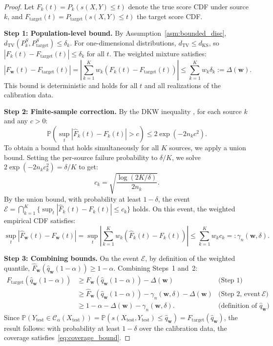 \documentclass{article}
\newcommand{\Prob}{\mathbb{P}}
\newcommand{\calC}{\mathcal{C}}
\newcommand{\dTV}{d_{\mathrm{TV}}}
\newcommand{\dKS}{d_{\mathrm{KS}}}
\newcommand{\Fhat}{\widehat{F}}
\newcommand{\qhat}{\widehat{q}}
\begin{document}
\begin{proof}
Let $F_k(t) = P_k(s(X,Y) \leq t)$ denote the true score CDF under source $k$, and $F_{\text{target}}(t) = P_{\text{target}}(s(X,Y) \leq t)$ the target score CDF.

\textbf{Step 1: Population-level bound.} By Assumption~\ref{asm:bounded_disc}, $\dTV(P_k^S, P_{\text{target}}^S) \leq \delta_k$. For one-dimensional distributions, $\dTV \leq \dKS$, so $|F_k(t) - F_{\text{target}}(t)| \leq \delta_k$ for all $t$. The weighted mixture satisfies:
\begin{equation}
|F_{\mathbf{w}}(t) - F_{\text{target}}(t)| = \left|\sum_{k=1}^K w_k (F_k(t) - F_{\text{target}}(t))\right| \leq \sum_{k=1}^K w_k \delta_k := \Delta(\mathbf{w}).
\end{equation}
This bound is deterministic and holds for all $t$ and all realizations of the calibration data.

\textbf{Step 2: Finite-sample correction.} By the DKW inequality \citep{massart1990tight}, for each source $k$ and any $c > 0$:
\begin{equation}
\Prob\left(\sup_t |\Fhat_k(t) - F_k(t)| > c\right) \leq 2\exp(-2n_k c^2).
\end{equation}
To obtain a bound that holds simultaneously for all $K$ sources, we apply a union bound. Setting the per-source failure probability to $\delta/K$, we solve $2\exp(-2n_k c_k^2) = \delta/K$ to get:
\begin{equation}
c_k = \sqrt{\frac{\log(2K/\delta)}{2n_k}}.
\end{equation}
By the union bound, with probability at least $1 - \delta$, the event $\mathcal{E} = \bigcap_{k=1}^K \{\sup_t |\Fhat_k(t) - F_k(t)| \leq c_k\}$ holds. On this event, the weighted empirical CDF satisfies:
\begin{equation}
\sup_t\left|\Fhat_{\mathbf{w}}(t) - F_{\mathbf{w}}(t)\right| = \sup_t\left|\sum_{k=1}^K w_k (\Fhat_k(t) - F_k(t))\right| \leq \sum_{k=1}^K w_k c_k =: \gamma_n(\mathbf{w}, \delta).
\end{equation}

\textbf{Step 3: Combining bounds.} On the event $\mathcal{E}$, by definition of the weighted quantile, $\Fhat_{\mathbf{w}}(\qhat_{\mathbf{w}}(1-\alpha)) \geq 1 - \alpha$. Combining Steps~1 and~2:
\begin{align}
F_{\text{target}}(\qhat_{\mathbf{w}}(1-\alpha)) &\geq F_{\mathbf{w}}(\qhat_{\mathbf{w}}(1-\alpha)) - \Delta(\mathbf{w}) & \text{(Step 1)} \\
&\geq \Fhat_{\mathbf{w}}(\qhat_{\mathbf{w}}(1-\alpha)) - \gamma_n(\mathbf{w}, \delta) - \Delta(\mathbf{w}) & \text{(Step 2, event $\mathcal{E}$)} \\
&\geq 1 - \alpha - \Delta(\mathbf{w}) - \gamma_n(\mathbf{w}, \delta). & \text{(definition of $\qhat_{\mathbf{w}}$)}
\end{align}
Since $\Prob(Y_{\text{test}} \in \calC_\alpha(X_{\text{test}})) = \Prob(s(X_{\text{test}}, Y_{\text{test}}) \leq \qhat_{\mathbf{w}}) = F_{\text{target}}(\qhat_{\mathbf{w}})$, the result follows: with probability at least $1 - \delta$ over the calibration data, the coverage satisfies~\eqref{eq:coverage_bound}.
\end{proof}
\end{document}
